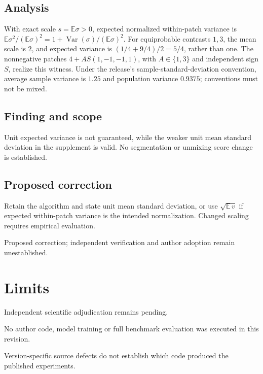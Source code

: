 \documentclass[11pt]{article}
\begin{document}
\subsection*{Analysis}

With exact scale \(s=\mathbb E\sigma>0\), expected normalized within-patch variance is \(\mathbb E\sigma^2/(\mathbb E\sigma)^2=1+\operatorname{Var}(\sigma)/(\mathbb E\sigma)^2\). For equiprobable contrasts \(1,3\), the mean scale is \(2\), and expected variance is \((1/4+9/4)/2=5/4\), rather than one. The nonnegative patches \(4+AS(1,-1,-1,1)\), with \(A\in\{1,3\}\) and independent sign \(S\), realize this witness. Under the release's sample-standard-deviation convention, average sample variance is \(1.25\) and population variance \(0.9375\); conventions must not be mixed.

\subsection*{Finding and scope}

Unit expected variance is not guaranteed, while the weaker unit mean standard deviation in the supplement is valid. No segmentation or unmixing score change is established.

\subsection*{Proposed correction}

Retain the algorithm and state unit mean standard deviation, or use \(\sqrt{\mathbb E\,v}\) if expected within-patch variance is the intended normalization. Changed scaling requires empirical evaluation.

Proposed correction; independent verification and author adoption remain unestablished.

\section*{Limits}

Independent scientific adjudication remains pending.\par

No author code, model training or full benchmark evaluation was executed in this revision.\par

Version-specific source defects do not establish which code produced the published experiments.\par
\end{document}
